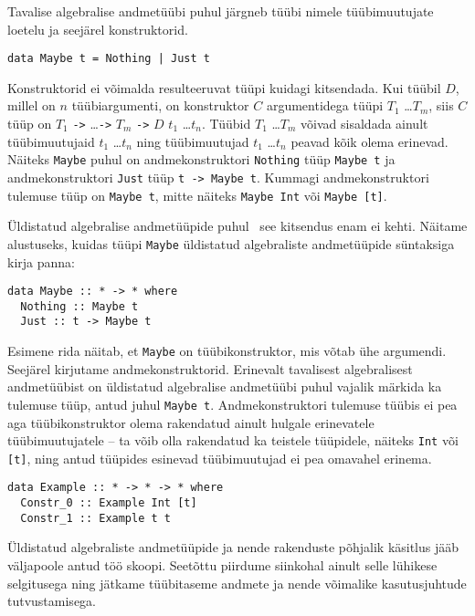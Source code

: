 \documentclass[12pt]{article}
\begin{document}
      Tavalise algebralise andmetüübi puhul järgneb tüübi nimele tüübimuutujate loetelu ja seejärel konstruktorid.

      \begin{verbatim}data Maybe t = Nothing | Just t\end{verbatim}

      Konstruktorid ei võimalda resulteeruvat tüüpi kuidagi kitsendada. Kui tüübil $D$, millel on $n$ tüübiargumenti, on konstruktor $C$ argumentidega tüüpi $T_1$ \ldots $T_m$, siis $C$ tüüp on $T_1$ \verb!->! \ldots \verb!->! $T_m$ \verb!->! $D$ $t_1$ \ldots $t_n$. Tüübid $T_1$ \ldots $T_m$ võivad sisaldada ainult tüübimuutujaid $t_1$ \ldots $t_n$ ning tüübimuutujad $t_1$ \ldots $t_n$ peavad kõik olema erinevad. Näiteks \verb!Maybe! puhul on andmekonstruktori \verb!Nothing! tüüp \verb!Maybe t! ja andmekonstruktori \verb!Just! tüüp \verb!t -> Maybe t!. Kummagi andmekonstruktori tulemuse tüüp on \verb!Maybe t!, mitte näiteks \verb!Maybe Int! või \verb!Maybe [t]!.

      Üldistatud algebralise andmetüüpide puhul~\cite{Fir} see kitsendus enam ei kehti. Näitame alustuseks, kuidas tüüpi \verb!Maybe! üldistatud algebraliste andmetüüpide süntaksiga kirja panna:

      \begin{verbatim}data Maybe :: * -> * where
  Nothing :: Maybe t
  Just :: t -> Maybe t\end{verbatim}

      Esimene rida näitab, et \verb!Maybe! on tüübikonstruktor, mis võtab ühe argumendi. Seejärel kirjutame andmekonstruktorid. Erinevalt tavalisest algebralisest andmetüübist on üldistatud algebralise andmetüübi puhul vajalik märkida ka tulemuse tüüp, antud juhul \verb!Maybe t!. Andmekonstruktori tulemuse tüübis ei pea aga tüübikonstruktor olema rakendatud ainult hulgale erinevatele tüübimuutujatele -- ta võib olla rakendatud ka teistele tüüpidele, näiteks \verb!Int! või \verb![t]!, ning antud tüüpides esinevad tüübimuutujad ei pea omavahel erinema.

      \begin{verbatim}data Example :: * -> * -> * where
  Constr_0 :: Example Int [t]
  Constr_1 :: Example t t\end{verbatim}

      Üldistatud algebraliste andmetüüpide ja nende rakenduste põhjalik käsitlus jääb väljapoole antud töö skoopi. Seetõttu piirdume siinkohal ainult selle lühikese selgitusega ning jätkame tüübitaseme andmete ja nende võimalike kasutusjuhtude tutvustamisega.
\end{document}
